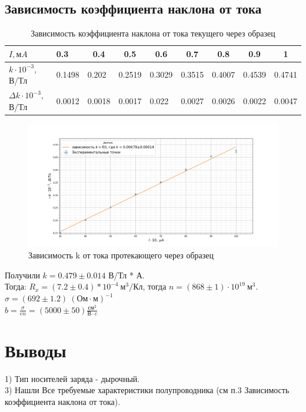 \documentclass[a4paper, 12pt]{article}%
\begin{document}
	\subsection*{Зависимость коэффициента наклона от тока}
	\begin{table}[H]
		\centering
		\begin{tabular}{|l|l|l|l|l|l|l|l|l|}
			\hline
			$I,  мA$ & 0.3     & \multicolumn{1}{c|}{0.4} & \multicolumn{1}{c|}{0.5} & \multicolumn{1}{c|}{0.6} & \multicolumn{1}{c|}{0.7} & \multicolumn{1}{c|}{0.8} & \multicolumn{1}{c|}{0.9} & \multicolumn{1}{c|}{1} \\ \hline
			$k\cdot10^{-3}$, В/Тл  & 0.1498 & 0.202                   & 0.2519                  & 0.3029                  & 0.3515                  & 0.4007                  & 0.4539                  & 0.4741                   \\ \hline
				$\Delta k\cdot10^{-3}$, В/Тл      & 0.0012 & 0.0018                  & 0.0017                  & 0.022                   & 0.0027                  & 0.0026                  & 0.0022                  & 0.0047                   \\ \hline
		\end{tabular}
		\caption{Зависимость коэффициента наклона от тока текущего через образец}
	\end{table}
	\begin{figure}[H]
		\centering
		\includegraphics[width=0.8\linewidth]{k}
		\caption{Зависимость k от тока протекающего через образец}
		\label{fig:k}
	\end{figure}
	Получили $k = 0.479 \pm 0.014$ В/Тл * А. \\
	Тогда: $R_x=(7.2\pm 0.4)*10^{-4} ~м^3/Кл$, тогда $n=(868\pm1)\cdot 10^{19}~м^3$.\\
	$\sigma = (692 \pm 1.2) ~(Ом\cdot м)^{-1}$\\
	$b = \frac{\sigma}{en} = (5000 \pm 50) \frac{см^2}{В\cdot c}$
	\section{Выводы}
	1) Тип носителей заряда - дырочный.\\
	3) Нашли Все требуемые характеристики полупроводника (см п.3 Зависимость коэффициента наклона от тока).\\
	
	
	
	
\end{document}
